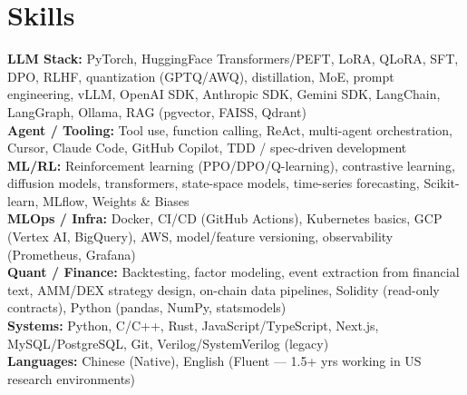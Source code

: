 \documentclass[letterpaper,10pt]{article}
\newcommand{\resumeSubHeadingListStart}{\begin{itemize}[leftmargin=0.15in, label={}]}
\newcommand{\resumeSubHeadingListEnd}{\end{itemize}}
\begin{document}
\section{Skills}
  \vspace{2pt}
  \resumeSubHeadingListStart
    \small{\item{
        \textbf{LLM Stack:}{ PyTorch, HuggingFace Transformers/PEFT, LoRA, QLoRA, SFT, DPO, RLHF, quantization (GPTQ/AWQ), distillation, MoE, prompt engineering, vLLM, OpenAI SDK, Anthropic SDK, Gemini SDK, LangChain, LangGraph, Ollama, RAG (pgvector, FAISS, Qdrant)} \\ \vspace{3pt}
        \textbf{Agent / Tooling:}{ Tool use, function calling, ReAct, multi-agent orchestration, Cursor, Claude Code, GitHub Copilot, TDD / spec-driven development} \\ \vspace{3pt}
        \textbf{ML/RL:}{ Reinforcement learning (PPO/DPO/Q-learning), contrastive learning, diffusion models, transformers, state-space models, time-series forecasting, Scikit-learn, MLflow, Weights \& Biases} \\ \vspace{3pt}
        \textbf{MLOps / Infra:}{ Docker, CI/CD (GitHub Actions), Kubernetes basics, GCP (Vertex AI, BigQuery), AWS, model/feature versioning, observability (Prometheus, Grafana)} \\ \vspace{3pt}
        \textbf{Quant / Finance:}{ Backtesting, factor modeling, event extraction from financial text, AMM/DEX strategy design, on-chain data pipelines, Solidity (read-only contracts), Python (pandas, NumPy, statsmodels)} \\ \vspace{3pt}
        \textbf{Systems:}{ Python, C/C++, Rust, JavaScript/TypeScript, Next.js, MySQL/PostgreSQL, Git, Verilog/SystemVerilog (legacy)} \\ \vspace{3pt}
        \textbf{Languages:}{ Chinese (Native), English (Fluent — 1.5+ yrs working in US research environments)}
    }}
  \resumeSubHeadingListEnd

\end{document}
